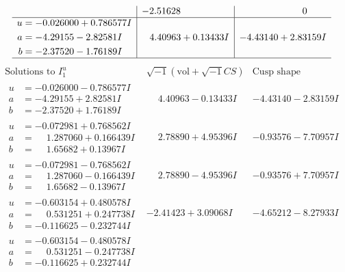 \documentclass[1p]{elsarticle_modified}
\theoremstyle{definition}
\newcommand{\I}{\sqrt{-1}}
\begin{document}
$$\begin{array}{c|c|c}
 & -2.51628\phantom{ +0.000000I} & \phantom{-0.000000 } 0 \\ \hline\begin{aligned}
u &= -0.026000 + 0.786577 I \\
a &= -4.29155 - 2.82581 I \\
b &= -2.37520 - 1.76189 I\end{aligned}
 & \phantom{-}4.40963 + 0.13433 I & -4.43140 + 2.83159 I\\
 \hline 
 \end{array}$$\newpage$$\begin{array}{c|c|c}  
\text{Solutions to }I^u_{1}& \I (\text{vol} + \sqrt{-1}CS) & \text{Cusp shape}\\
 \hline 
\begin{aligned}
u &= -0.026000 - 0.786577 I \\
a &= -4.29155 + 2.82581 I \\
b &= -2.37520 + 1.76189 I\end{aligned}
 & \phantom{-}4.40963 - 0.13433 I & -4.43140 - 2.83159 I \\ \hline\begin{aligned}
u &= -0.072981 + 0.768562 I \\
a &= \phantom{-}1.287060 + 0.166439 I \\
b &= \phantom{-}1.65682 + 0.13967 I\end{aligned}
 & \phantom{-}2.78890 + 4.95396 I & -0.93576 - 7.70957 I \\ \hline\begin{aligned}
u &= -0.072981 - 0.768562 I \\
a &= \phantom{-}1.287060 - 0.166439 I \\
b &= \phantom{-}1.65682 - 0.13967 I\end{aligned}
 & \phantom{-}2.78890 - 4.95396 I & -0.93576 + 7.70957 I \\ \hline\begin{aligned}
u &= -0.603154 + 0.480578 I \\
a &= \phantom{-}0.531251 + 0.247738 I \\
b &= -0.116625 - 0.232744 I\end{aligned}
 & -2.41423 + 3.09068 I & -4.65212 - 8.27933 I \\ \hline\begin{aligned}
u &= -0.603154 - 0.480578 I \\
a &= \phantom{-}0.531251 - 0.247738 I \\
b &= -0.116625 + 0.232744 I\end{aligned}

\end{array}$$
\end{document}

